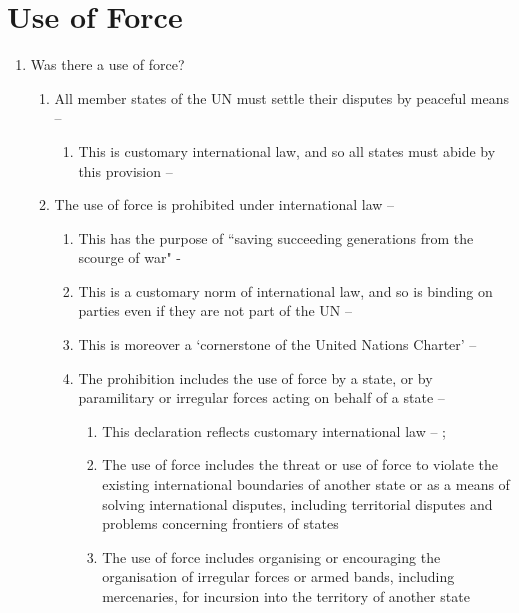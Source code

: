 \section{Use of Force}
\begin{enumerate}
    \item Was there a use of force?
    \begin{enumerate}
        \item All member states of the UN must settle their disputes by peaceful means -- 
        \begin{enumerate}
            \item This is customary international law, and so all states must abide by this provision -- 
        \end{enumerate}
        \item The use of force is prohibited under international law -- 
        \begin{enumerate}
            \item This has the purpose of ``saving succeeding generations from the scourge of war" - 
            \item This is a customary norm of international law, and so is binding on parties even if they are not part of the UN -- 
            \item This is moreover a `cornerstone of the United Nations Charter' -- 
            \item The prohibition includes the use of force by a state, or by paramilitary or irregular forces acting on behalf of a state -- 
            \begin{enumerate}
                \item This declaration reflects customary international law -- ; 
                \item The use of force includes the threat or use of force to violate the existing international boundaries of another state or as a means of solving international disputes, including territorial disputes and problems concerning frontiers of states 
                \item The use of force includes organising or encouraging the organisation of irregular forces or armed bands, including mercenaries, for incursion into the territory of another state

\end{enumerate}
\end{enumerate}
\end{enumerate}
\end{enumerate}
